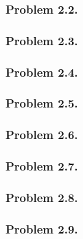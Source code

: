 \documentclass{article}
\begin{document}
\subsubsection{Problem 2.2.}
\subsubsection{Problem 2.3.}
\subsubsection{Problem 2.4.}
\subsubsection{Problem 2.5.}
\subsubsection{Problem 2.6.}
\subsubsection{Problem 2.7.}
\subsubsection{Problem 2.8.}
\subsubsection{Problem 2.9.}
\end{document}
